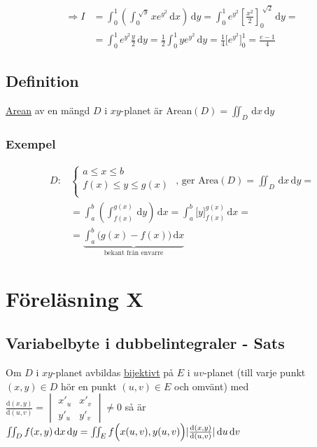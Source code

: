 \documentclass[a4paper]{article}
\DeclarePairedDelimiter \abs{\lvert}{\rvert}
\let\oldsqrt\sqrt
\renewcommand*{\sqrt}[2][\ ]{\oldsqrt[#1]{#2} }
\begin{document}
\begin{align*}
	\Rightarrow I &= \int_0^1 \left( \int_0^{\sqrt{y}} xe^{y^2} \,\mathrm{d}x \right) \,\mathrm{d}y = \int_0^1 e^{y^2} \left[\frac{x^2}{2}\right]_0^{\sqrt{2}} \,\mathrm{d}y = \\
	              &= \int_0^1 e^{y^2} \frac{y}{2} \,\mathrm{d}y = \frac{1}{2} \int_0^1 ye^{y^2} \,\mathrm{d}y = \frac{1}{4} \Bigg[ e^{y^2} \Bigg]_0^1 = \frac{e-1}{4}
\end{align*}

\newpage
\subsection{Definition} 
\underline{Arean} av en mängd $D$ i $xy$-planet är Arean$(D) = \iint_D \,\mathrm{d}x\,\mathrm{d}y$ \label{subsec:Area}

\subsubsection{Exempel}

\begin{align*}
	D: &
	\begin{cases}
	a \leq x \leq b \\
	f(x) \leq y \leq g(x) \\
	\end{cases}
\text{   , ger Area}(D) = \iint_D \,\mathrm{d}x\,\mathrm{d}y = \\
&= \int_a^b \left( \int_{f(x)}^{g(x)} \,\mathrm{d}y \right) \,\mathrm{d}x = \int_a^b \Bigg[ y \Bigg]_{f(x)}^{g(x)} \,\mathrm{d}x = \\
&= \underbrace{\int_a^b \Big(g(x) - f(x) \Big) \,\mathrm{d}x}_{\text{bekant från envarre}}
\end{align*}







\newpage
\section{Föreläsning X}
\subsection{Variabelbyte i dubbelintegraler - Sats}
Om $D$ i $xy$-planet avbildas \underline{bijektivt} på $E$ i $uv$-planet (till varje punkt $(x,y) \in D$ hör en punkt $(u,v) \in E$ och omvänt) med \(\frac{\mathrm{d}(x,y)}{\mathrm{d}(u,v)} = 
\begin{vmatrix}
	x'_u & x'_v \\
	y'_u & y'_v
\end{vmatrix} \neq 0\)
så är $\iint_D f(x,y) \,\mathrm{d}x\,\mathrm{d}y = \iint_E f\Big( x(u,v),y(u,v) \Big)\abs{\frac{\mathrm{d}(x,y)}{\mathrm{d}(u,v)}}\,\mathrm{d}u\,\mathrm{d}v$
\end{document}
